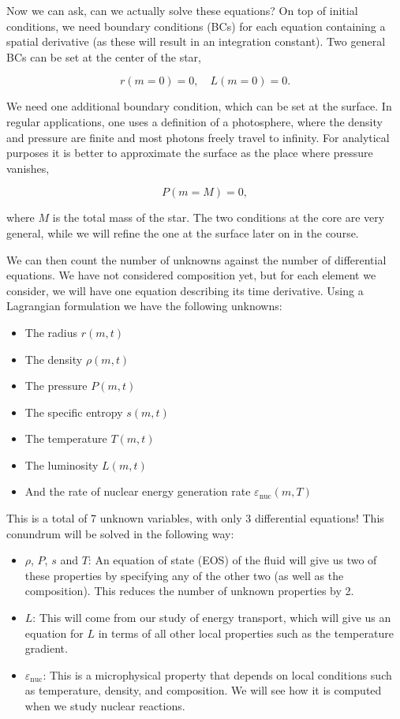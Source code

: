\documentclass[twocolumn]{article}
\providecommand{\tightlist}{%
  \setlength{\itemsep}{0pt}\setlength{\parskip}{0pt}}
\begin{document}
Now we can ask, can we actually solve these equations? On top of initial
conditions, we need boundary conditions (BCs) for each equation
containing a spatial derivative (as these will result in an integration
constant). Two general BCs can be set at the center of the star,

\[r(m=0)=0,\quad L(m=0)=0.\]

We need one additional boundary condition, which can be set at the
surface. In regular applications, one uses a definition of a
photosphere, where the density and pressure are finite and most photons
freely travel to infinity. For analytical purposes it is better to
approximate the surface as the place where pressure vanishes,

\[P(m=M)=0,\]

where \(M\) is the total mass of the star. The two conditions at the
core are very general, while we will refine the one at the surface later
on in the course.

We can then count the number of unknowns against the number of
differential equations. We have not considered composition yet, but for
each element we consider, we will have one equation describing its time
derivative. Using a Lagrangian formulation we have the following
unknowns:

\begin{itemize}
\tightlist
\item
  The radius \(r(m,t)\)
\item
  The density \(\rho(m,t)\)
\item
  The pressure \(P(m,t)\)
\item
  The specific entropy \(s(m,t)\)
\item
  The temperature \(T(m,t)\)
\item
  The luminosity \(L(m,t)\)
\item
  And the rate of nuclear energy generation rate
  \(\varepsilon_\mathrm{nuc}(m,T)\)
\end{itemize}

This is a total of 7 unknown variables, with only 3 differential
equations! This conundrum will be solved in the following way:

\begin{itemize}
\tightlist
\item
  \(\rho\), \(P\), \(s\) and \(T\): An equation of state (EOS) of the
  fluid will give us two of these properties by specifying any of the
  other two (as well as the composition). This reduces the number of
  unknown properties by 2.
\item
  \(L\): This will come from our study of energy transport, which will
  give us an equation for \(L\) in terms of all other local properties
  such as the temperature gradient.
\item
  \(\varepsilon_\mathrm{nuc}\): This is a microphysical property that
  depends on local conditions such as temperature, density, and
  composition. We will see how it is computed when we study nuclear
  reactions.
\end{itemize}
\end{document}
